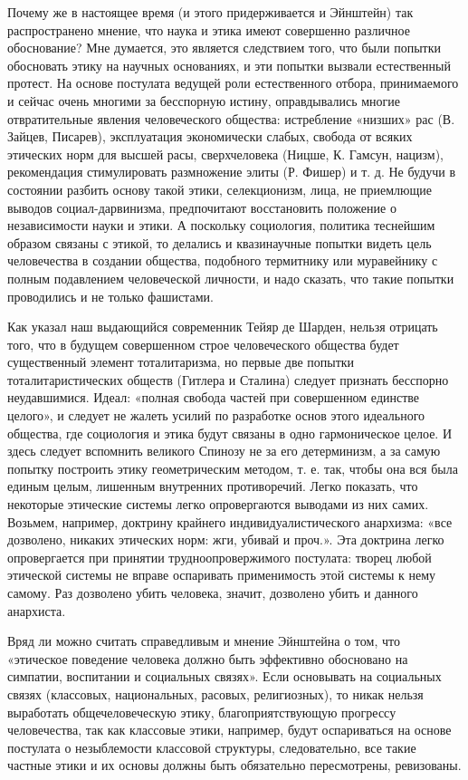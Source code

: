 Почему же  в настоящее время  (и этого придерживается и  Эйнштейн) так
распространено мнение,  что наука  и этика имеют  совершенно различное
обоснование?  Мне думается,  это  является следствием  того, что  были
попытки обосновать этику на научных  основаниях, и эти попытки вызвали
естественный протест.  На основе постулата ведущей  роли естественного
отбора,  принимаемого и  сейчас  очень многими  за бесспорную  истину,
оправдывались  многие отвратительные  явления человеческого  общества:
истребление   «низших»   рас   (В.  Зайцев,   Писарев),   эксплуатация
экономически слабых, свобода от всяких этических норм для высшей расы,
сверхчеловека (Ницше,  К. Гамсун, нацизм),  рекомендация стимулировать
размножение элиты  (Р. Фишер) и  т. д.  Не будучи в  состоянии разбить
основу  такой   этики,  селекционизм,  лица,  не   приемлющие  выводов
социал-дарвинизма, предпочитают восстановить положение о независимости
науки  и этики.  А  поскольку социология,  политика теснейшим  образом
связаны  с этикой,  то  делались и  квазинаучные  попытки видеть  цель
человечества в создании общества, подобного термитнику или муравейнику
с полным подавлением человеческой личности,  и надо сказать, что такие
попытки проводились и не только фашистами.

Как  указал  наш  выдающийся   современник  Тейяр  де  Шарден,  нельзя
отрицать того, что в  будущем совершенном строе человеческого общества
будет  существенный  элемент  тоталитаризма,  но  первые  две  попытки
тоталитаристических  обществ  (Гитлера  и  Сталина)  следует  признать
бесспорно неудавшимися. Идеал: «полная  свобода частей при совершенном
единстве целого», и следует не жалеть усилий по разработке основ этого
идеального  общества, где  социология  и этика  будут  связаны в  одно
гармоническое целое. И здесь следует  вспомнить великого Спинозу не за
его  детерминизм, а  за самую  попытку построить  этику геометрическим
методом,  т.  е.  так,  чтобы  она вся  была  единым  целым,  лишенным
внутренних  противоречий.  Легко  показать,  что  некоторые  этические
системы легко опровергаются выводами  из них самих. Возьмем, например,
доктрину  крайнего  индивидуалистического анархизма:  «все  дозволено,
никаких  этических норм:  жги,  убивай и  проч.».  Эта доктрина  легко
опровергается при принятии трудноопровержимого постулата: творец любой
этической  системы не  вправе оспаривать  применимость этой  системы к
нему самому. Раз  дозволено убить человека, значит,  дозволено убить и
данного анархиста.

Вряд  ли можно  считать справедливым  и  мнение Эйнштейна  о том,  что
«этическое  поведение  человека   должно  быть  эффективно  обосновано
на  симпатии,  воспитании и  социальных  связях».  Если основывать  на
социальных связях (классовых,  национальных, расовых, религиозных), то
никак  нельзя  выработать общечеловеческую  этику,  благоприятствующую
прогрессу  человечества,  так  как классовые  этики,  например,  будут
оспариваться на  основе постулата о незыблемости  классовой структуры,
следовательно,  все  такие  частные  этики и  их  основы  должны  быть
обязательно пересмотрены, ревизованы.

